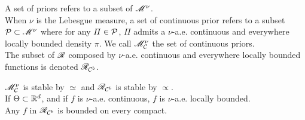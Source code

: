 \begin{defi}
    A set of priors refers to a subset of $\mathscr{M}^\nu$.\\
    When $\nu$ is the Lebesgue measure, a set of continuous prior refers to a subset $\mathcal{P}\subset\mathscr{M}^\nu$ where for any $\varPi\in\mathcal{P}$, $\varPi$ admits a $\nu$-a.e. continuous and everywhere locally bounded density $\pi$. We call $\mathscr{M}_{\mathcal{C}}^\nu$ the set of continuous priors.\\
    The subset of $\mathscr{R}$ composed by $\nu$-a.e. continuous and everywhere locally bounded functions is denoted $\mathscr{R}_{\mathcal{C}^b}$.
\end{defi}

\begin{prop}
    $\mathscr{M}_{\mathcal{C}}^\nu$ is stable by $\simeq$ and $\mathscr{R}_{\mathcal{C}^b}$ is stable by $\propto$.\\
    If $\Theta\subset\mathbb{R}^d$, and if $f$ is $\nu$-a.e. continuous, $f$ is $\nu$-a.e. locally bounded.\\ %
    Any $f$ in $\mathscr{R}_{\mathcal{C}^b}$ is bounded on every compact.
\end{prop}

